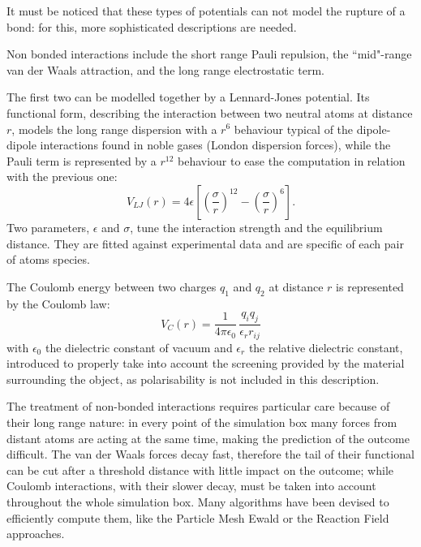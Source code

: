 \documentclass[graybox]{svmult}
\begin{document}
It must be noticed that these types of potentials can not model the rupture of a bond: for this, more sophisticated descriptions are needed.


Non bonded interactions include the short range Pauli repulsion, the ``mid"-range van der Waals attraction, and the long range electrostatic term.

The first two can be modelled together by a Lennard-Jones potential. Its functional form, describing the interaction between two neutral atoms at distance $r$, models the long range dispersion with a $r^6$ behaviour typical of the dipole-dipole interactions found in noble gases (London dispersion forces), while the Pauli term is represented by a $r^{12}$ behaviour to ease the computation in relation with the previous one:
\begin{equation}
V_{LJ}(r) = 4 \epsilon \left[ \left( \frac{\sigma}{r} \right)^{12} - \left( \frac{\sigma}{r} \right)^6 \right].
\end{equation}
Two parameters, $\epsilon$ and $\sigma$, tune the interaction strength and the equilibrium distance. They are fitted against experimental data and are specific of each pair of atoms species.

The Coulomb energy between two charges $q_1$ and $q_2$ at distance $r$ is represented by the Coulomb law:
\begin{equation}
V_C(r) = \frac{1}{4 \pi \epsilon_0} \, \frac{q_i q_j}{\epsilon_r r_{ij}}
\end{equation}
with $\epsilon_0$ the dielectric constant of vacuum and $\epsilon_r$ the relative dielectric constant, introduced to properly take into account the screening provided by the material surrounding the object, as polarisability is not included in this description.

The treatment of non-bonded interactions requires particular care because of their long range nature: in every point of the simulation box many forces from distant atoms are acting at the same time, making the prediction of the outcome difficult.
%
The van der Waals forces decay fast, therefore the tail of their functional can be cut after a threshold distance with little impact on the outcome; while Coulomb interactions, with their slower decay, must be taken into account throughout the whole simulation box. Many algorithms have been devised to efficiently compute them, like the Particle Mesh Ewald \cite{Essmann1995} or the Reaction Field \cite{Tironi1995} approaches. 
\end{document}
